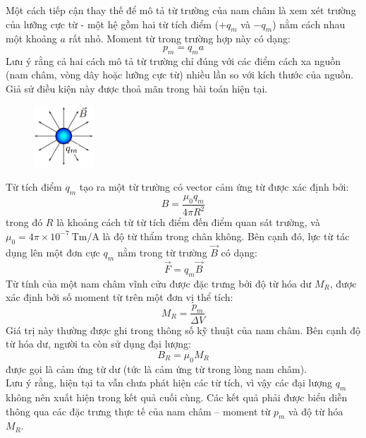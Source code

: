 \indent Một cách tiếp cận thay thế để mô tả từ trường của nam châm là xem xét trường của lưỡng cực từ - một hệ gồm hai từ tích điểm ($+q_m$ và $-q_m$) nằm cách nhau một khoảng $a$ rất nhỏ. Moment từ trong trường hợp này có dạng:
\begin{equation*}
  p_m = q_m a
\end{equation*}
Lưu ý rằng cả hai cách mô tả từ trường chỉ đúng với các điểm cách xa nguồn (nam châm, vòng dây hoặc lưỡng cực từ) nhiều lần so với kích thước của nguồn. Giả sử điều kiện này được thoả mãn trong bài toán hiện tại.\\
\vspace{-0.5cm}
\begin{figure}
  \centering
  \vspace{-0.55cm}
  \includegraphics[width=0.2\textwidth]{Figures/Problems/Fig 2.3.png}
\end{figure}
\indent Từ tích điểm $q_m$ tạo ra một từ trường có vector cảm ứng từ được xác định bởi:
\begin{equation*}
  B = \frac{\mu_0 q_m}{4\pi R^2}
\end{equation*}
trong đó $R$ là khoảng cách từ từ tích điểm đến điểm quan sát trường, và $\mu_0 = 4\pi \times 10^{-7}~\text{Tm/A}$ là độ từ thẩm trong chân không. Bên cạnh đó, lực từ tác dụng lên một đơn cực $q_m$ nằm trong từ trường $\vec{B}$ có dạng:
\begin{equation*}
  \vec{F} = q_m \vec{B}
\end{equation*}
\indent Từ tính của một nam châm vĩnh cửu được đặc trưng bởi độ từ hóa dư $M_R$, được xác định bởi số moment từ trên một đơn vị thể tích:
\begin{equation*}
  M_R = \frac{p_m}{\Delta V}
\end{equation*}
Giá trị này thường được ghi trong thông số kỹ thuật của nam châm. Bên cạnh độ từ hóa dư, người ta còn sử dụng đại lượng:
\begin{equation*}
  B_R = \mu_0 M_R
\end{equation*}
được gọi là cảm ứng từ dư (tức là cảm ứng từ trong lòng nam châm).\\
\indent Lưu ý rằng, hiện tại ta vẫn chưa phát hiện các từ tích, vì vậy các đại lượng $q_m$ không nên xuất hiện trong kết quả cuối cùng. Các kết quả phải được biểu diễn thông qua các đặc trưng thực tế của nam châm – moment từ $p_m$ và độ từ hóa $M_R$.

